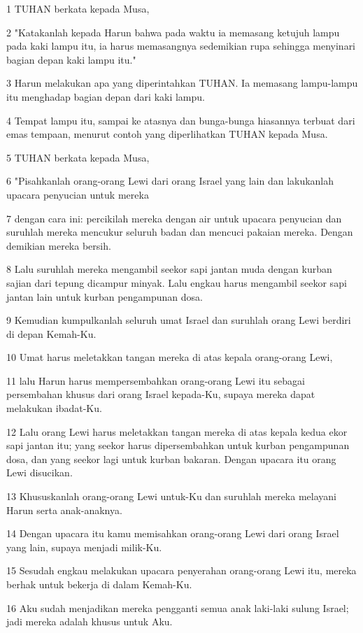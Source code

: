 \par 1 TUHAN berkata kepada Musa,
\par 2 "Katakanlah kepada Harun bahwa pada waktu ia memasang ketujuh lampu pada kaki lampu itu, ia harus memasangnya sedemikian rupa sehingga menyinari bagian depan kaki lampu itu."
\par 3 Harun melakukan apa yang diperintahkan TUHAN. Ia memasang lampu-lampu itu menghadap bagian depan dari kaki lampu.
\par 4 Tempat lampu itu, sampai ke atasnya dan bunga-bunga hiasannya terbuat dari emas tempaan, menurut contoh yang diperlihatkan TUHAN kepada Musa.
\par 5 TUHAN berkata kepada Musa,
\par 6 "Pisahkanlah orang-orang Lewi dari orang Israel yang lain dan lakukanlah upacara penyucian untuk mereka
\par 7 dengan cara ini: percikilah mereka dengan air untuk upacara penyucian dan suruhlah mereka mencukur seluruh badan dan mencuci pakaian mereka. Dengan demikian mereka bersih.
\par 8 Lalu suruhlah mereka mengambil seekor sapi jantan muda dengan kurban sajian dari tepung dicampur minyak. Lalu engkau harus mengambil seekor sapi jantan lain untuk kurban pengampunan dosa.
\par 9 Kemudian kumpulkanlah seluruh umat Israel dan suruhlah orang Lewi berdiri di depan Kemah-Ku.
\par 10 Umat harus meletakkan tangan mereka di atas kepala orang-orang Lewi,
\par 11 lalu Harun harus mempersembahkan orang-orang Lewi itu sebagai persembahan khusus dari orang Israel kepada-Ku, supaya mereka dapat melakukan ibadat-Ku.
\par 12 Lalu orang Lewi harus meletakkan tangan mereka di atas kepala kedua ekor sapi jantan itu; yang seekor harus dipersembahkan untuk kurban pengampunan dosa, dan yang seekor lagi untuk kurban bakaran. Dengan upacara itu orang Lewi disucikan.
\par 13 Khususkanlah orang-orang Lewi untuk-Ku dan suruhlah mereka melayani Harun serta anak-anaknya.
\par 14 Dengan upacara itu kamu memisahkan orang-orang Lewi dari orang Israel yang lain, supaya menjadi milik-Ku.
\par 15 Sesudah engkau melakukan upacara penyerahan orang-orang Lewi itu, mereka berhak untuk bekerja di dalam Kemah-Ku.
\par 16 Aku sudah menjadikan mereka pengganti semua anak laki-laki sulung Israel; jadi mereka adalah khusus untuk Aku.

